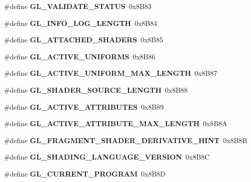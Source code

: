 \begin{DoxyCompactItemize}
\item 
\#define {\bfseries G\+L\+\_\+\+V\+A\+L\+I\+D\+A\+T\+E\+\_\+\+S\+T\+A\+T\+U\+S}~0x8\+B83\label{_s_d_l__opengl_8h_a24b642fbcaffb55c9131a1e7d981e9cc}

\item 
\#define {\bfseries G\+L\+\_\+\+I\+N\+F\+O\+\_\+\+L\+O\+G\+\_\+\+L\+E\+N\+G\+T\+H}~0x8\+B84\label{_s_d_l__opengl_8h_ae77c1e831fd164e9ac6c1a9cdb697ce5}

\item 
\#define {\bfseries G\+L\+\_\+\+A\+T\+T\+A\+C\+H\+E\+D\+\_\+\+S\+H\+A\+D\+E\+R\+S}~0x8\+B85\label{_s_d_l__opengl_8h_aedbcf4c659a8f3ad9714c3171d7dcb66}

\item 
\#define {\bfseries G\+L\+\_\+\+A\+C\+T\+I\+V\+E\+\_\+\+U\+N\+I\+F\+O\+R\+M\+S}~0x8\+B86\label{_s_d_l__opengl_8h_aeb14db2a9d0c7a5aaddec813bbdbfa22}

\item 
\#define {\bfseries G\+L\+\_\+\+A\+C\+T\+I\+V\+E\+\_\+\+U\+N\+I\+F\+O\+R\+M\+\_\+\+M\+A\+X\+\_\+\+L\+E\+N\+G\+T\+H}~0x8\+B87\label{_s_d_l__opengl_8h_a3bcf0a47bfa33bf14698c2b9eb5fa472}

\item 
\#define {\bfseries G\+L\+\_\+\+S\+H\+A\+D\+E\+R\+\_\+\+S\+O\+U\+R\+C\+E\+\_\+\+L\+E\+N\+G\+T\+H}~0x8\+B88\label{_s_d_l__opengl_8h_a7b395fbd7051f340da13f8777b24fc5f}

\item 
\#define {\bfseries G\+L\+\_\+\+A\+C\+T\+I\+V\+E\+\_\+\+A\+T\+T\+R\+I\+B\+U\+T\+E\+S}~0x8\+B89\label{_s_d_l__opengl_8h_aa7c727896f0964d71eacb6ccb57ad328}

\item 
\#define {\bfseries G\+L\+\_\+\+A\+C\+T\+I\+V\+E\+\_\+\+A\+T\+T\+R\+I\+B\+U\+T\+E\+\_\+\+M\+A\+X\+\_\+\+L\+E\+N\+G\+T\+H}~0x8\+B8\+A\label{_s_d_l__opengl_8h_ac70225d2da03ecc6671e9e7967fa6f60}

\item 
\#define {\bfseries G\+L\+\_\+\+F\+R\+A\+G\+M\+E\+N\+T\+\_\+\+S\+H\+A\+D\+E\+R\+\_\+\+D\+E\+R\+I\+V\+A\+T\+I\+V\+E\+\_\+\+H\+I\+N\+T}~0x8\+B8\+B\label{_s_d_l__opengl_8h_a8afd2d52d8a440f4b8b05d6284308710}

\item 
\#define {\bfseries G\+L\+\_\+\+S\+H\+A\+D\+I\+N\+G\+\_\+\+L\+A\+N\+G\+U\+A\+G\+E\+\_\+\+V\+E\+R\+S\+I\+O\+N}~0x8\+B8\+C\label{_s_d_l__opengl_8h_acd91f154544ab6a152e97adcb742c891}

\item 
\#define {\bfseries G\+L\+\_\+\+C\+U\+R\+R\+E\+N\+T\+\_\+\+P\+R\+O\+G\+R\+A\+M}~0x8\+B8\+D\label{_s_d_l__opengl_8h_a25774e2f5a5f0edba78f232ea706ffc0}


\end{DoxyCompactItemize}
